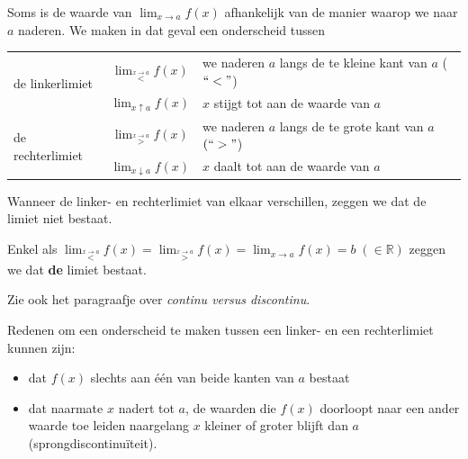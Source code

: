 Soms is de waarde van ${\displaystyle \lim_{x\to a}}f(x)$ afhankelijk
van de manier waarop we naar $a$ naderen. We maken in dat geval een
onderscheid tussen



\begin{table}[h]
\centering
\begin{tabular}{|l|c|l|}
	\hline 
	\multirow{2}{*}{de linkerlimiet} & ${\displaystyle \lim_{\overset{x\rightarrow a}{<}}}f(x)$ & we naderen $a$ langs de te kleine kant van $a$ ($\lyxmathsym{\textquotedblleft}<\lyxmathsym{\textquotedblright}$)\\
	\cline{2-3} 
	& ${\displaystyle \lim_{x\uparrow a}}f(x)$ & $x$ stijgt tot aan de waarde van $a$\\
	\hline 
	\multirow{2}{*}{de rechterlimiet} & ${\displaystyle \lim_{\overset{x\rightarrow a}{>}}}f(x)$ & we naderen $a$ langs de te grote kant van $a$ $(\lyxmathsym{\textquotedblleft}>\lyxmathsym{\textquotedblright}$)\\
	\cline{2-3} 
	& ${\displaystyle \lim_{x\downarrow a}}f(x)$ & $x$ daalt tot aan de waarde van $a$\\
	\hline 
\end{tabular}
\end{table}




Wanneer de linker- en rechterlimiet van elkaar verschillen,
zeggen we dat de limiet niet bestaat. 

Enkel als ${\displaystyle \lim_{\overset{x\rightarrow a}{<}}}f(x)={\displaystyle \lim_{\overset{x\rightarrow a}{>}}}f(x)={\displaystyle \lim_{x\to a}}f(x)=b\;(\in\mathbb{R})$
zeggen we dat \textbf{de} limiet bestaat.

Zie ook het paragraafje over \emph{continu versus discontinu}.

Redenen om een onderscheid te maken tussen een linker- en
een rechterlimiet kunnen zijn:
\begin{itemize}
\item dat $f(x)$ slechts aan \'e\'en van beide kanten van $a$ bestaat
\item dat naarmate $x$ nadert tot $a$, de waarden die $f(x)$ doorloopt
naar een ander waarde toe leiden naargelang $x$ kleiner of groter
blijft dan $a$ (sprongdiscontinu\"iteit).
\end{itemize}

